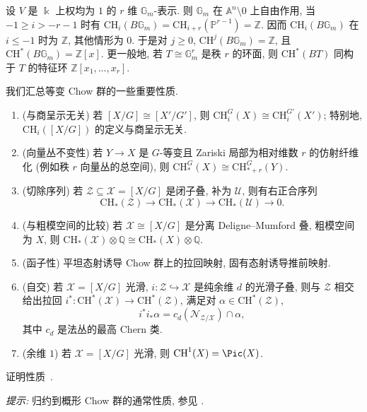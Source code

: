 \begin{example}\label{src:7.1.35}
设 $V$ 是 $\Bbbk$ 上权均为 $1$ 的 $r$ 维 $\mathbb G_m$-表示. 则 $\mathbb G_m$ 在 $\mathbb A^n\setminus0$ 上自由作用, 当 $-1\geq i>-r-1$ 时有 $\mathrm{CH}_i(B\mathbb G_m)=\mathrm{CH}_{i+r}(\mathbb P^{r-1})=\mathbb Z$. 因而 $\mathrm{CH}_i(B\mathbb G_m)$ 在 $i\leq-1$ 时为 $\mathbb Z$, 其他情形为 $0$. 于是对 $j\geq0$, $\mathrm{CH}^j(B\mathbb G_m)=\mathbb Z$, 且 $\mathrm{CH}^*(B\mathbb G_m)=\mathbb Z[x]$. 更一般地, 若 $T\cong\mathbb G_m^r$ 是秩 $r$ 的环面, 则 $\mathrm{CH}^*(BT)$ 同构于 $T$ 的特征环 $\mathbb Z[x_1,\ldots,x_r]$.
\end{example}
我们汇总等变 Chow 群的一些重要性质.
\begin{properties}\label{src:7.1.36}
\begin{enumerate}[(1)]
\item (与商呈示无关) 若 $[X/G]\cong[X'/G']$, 则 $\mathrm{CH}_i^G(X)\cong\mathrm{CH}_i^{G'}(X')$; 特别地, $\mathrm{CH}_i([X/G])$ 的定义与商呈示无关.
\item (向量丛不变性) 若 $Y\to X$ 是 $G$-等变且 Zariski 局部为相对维数 $r$ 的仿射纤维化 (例如秩 $r$ 向量丛的总空间), 则 $\mathrm{CH}_*^G(X)\cong\mathrm{CH}_{*+r}^G(Y)$.
\item (切除序列) 若 $\mathcal Z\subseteq\mathcal X=[X/G]$ 是闭子叠, 补为 $\mathcal U$, 则有右正合序列
\[
\mathrm{CH}_*(\mathcal Z)\longrightarrow\mathrm{CH}_*(\mathcal X)\longrightarrow\mathrm{CH}_*(\mathcal U)\longrightarrow0.
\]
\item (与粗模空间的比较) 若 $\mathcal X\cong[X/G]$ 是分离 Deligne--Mumford 叠, 粗模空间为 $X$, 则 $\mathrm{CH}_*(\mathcal X)\otimes\mathbb Q\cong\mathrm{CH}_*(X)\otimes\mathbb Q$.
\item (函子性) 平坦态射诱导 Chow 群上的拉回映射, 固有态射诱导推前映射.
\item (自交) 若 $\mathcal X=[X/G]$ 光滑, $i:\mathcal Z\hookrightarrow\mathcal X$ 是纯余维 $d$ 的光滑子叠, 则与 $\mathcal Z$ 相交给出拉回 $i^*:\mathrm{CH}^*(\mathcal X)\to\mathrm{CH}^*(\mathcal Z)$, 满足对 $\alpha\in\mathrm{CH}^*(\mathcal Z)$,
\[
i^*i_*\alpha=c_d(\mathcal N_{\mathcal Z/\mathcal X})\cap\alpha,
\]
其中 $c_d$ 是法丛的最高 Chern 类.
\item (余维 $1$) 若 $\mathcal X=[X/G]$ 光滑, 则 $\mathrm{CH}^1(\mathcal X)=\Pic(\mathcal X)$.
\end{enumerate}
\end{properties}
\begin{exercise}[困难]\label{src:7.1.37}
证明性质~.

\textit{提示:} 归约到概形 Chow 群的通常性质, 参见 \cite{Ful98}.
\end{exercise}

